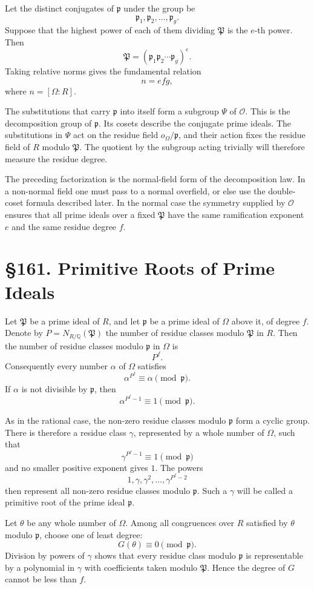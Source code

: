 \documentclass[12pt,a4paper]{article}
\newcommand{\webersection}[2]{\clearpage\section*{\S #1. #2}}
\newcommand{\Pgr}{\mathfrak P}
\newcommand{\p}{\mathfrak p}
\begin{document}
Let the distinct conjugates of \(\p\) under the group be
\[
  \p_1,\p_2,\ldots,\p_g.
\]
Suppose that the highest power of each of them dividing \(\Pgr\) is the \(e\)-th power.  Then
\[
  \Pgr=(\p_1\p_2\cdots\p_g)^e.
\tag{2}
\]
Taking relative norms gives the fundamental relation
\[
  n=efg,
\tag{3}
\]
where \(n=[\Omega:R]\).

The substitutions that carry \(\p\) into itself form a subgroup \(\Psi\) of \(\mathcal O\).  This is the decomposition group of \(\p\).  Its cosets describe the conjugate prime ideals.  The substitutions in \(\Psi\) act on the residue field \(o_\Omega/\p\), and their action fixes the residue field of \(R\) modulo \(\Pgr\).  The quotient by the subgroup acting trivially will therefore measure the residue degree.

The preceding factorization is the normal-field form of the decomposition law.  In a non-normal field one must pass to a normal overfield, or else use the double-coset formula described later.  In the normal case the symmetry supplied by \(\mathcal O\) ensures that all prime ideals over a fixed \(\Pgr\) have the same ramification exponent \(e\) and the same residue degree \(f\).

\webersection{161}{Primitive Roots of Prime Ideals}

Let \(\Pgr\) be a prime ideal of \(R\), and let \(\p\) be a prime ideal of \(\Omega\) above it, of degree \(f\).  Denote by \(P=N_{R/\mathbb Q}(\Pgr)\) the number of residue classes modulo \(\Pgr\) in \(R\).  Then the number of residue classes modulo \(\p\) in \(\Omega\) is
\[
  P^f.
\]
Consequently every number \(\alpha\) of \(\Omega\) satisfies
\[
  \alpha^{P^f}\equiv \alpha \pmod{\p}.
\tag{1}
\]
If \(\alpha\) is not divisible by \(\p\), then
\[
  \alpha^{P^f-1}\equiv1\pmod{\p}.
\]

As in the rational case, the non-zero residue classes modulo \(\p\) form a cyclic group.  There is therefore a residue class \(\gamma\), represented by a whole number of \(\Omega\), such that
\[
  \gamma^{P^f-1}\equiv1\pmod{\p}
\]
and no smaller positive exponent gives \(1\).  The powers
\[
  1,\gamma,\gamma^2,\ldots,\gamma^{P^f-2}
\]
then represent all non-zero residue classes modulo \(\p\).  Such a \(\gamma\) will be called a primitive root of the prime ideal \(\p\).

Let \(\theta\) be any whole number of \(\Omega\).  Among all congruences over \(R\) satisfied by \(\theta\) modulo \(\p\), choose one of least degree:
\[
  G(\theta)\equiv0\pmod{\p}.
\tag{2}
\]
Division by powers of \(\gamma\) shows that every residue class modulo \(\p\) is representable by a polynomial in \(\gamma\) with coefficients taken modulo \(\Pgr\).  Hence the degree of \(G\) cannot be less than \(f\).
\end{document}
